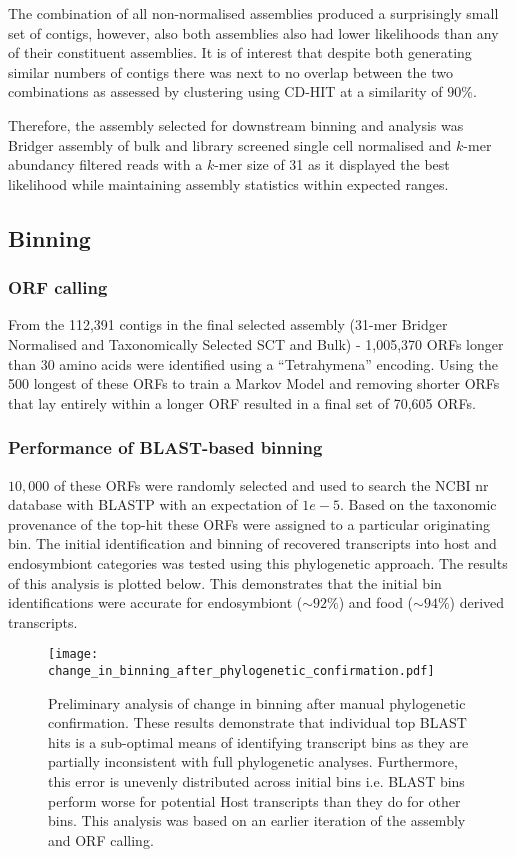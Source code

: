 The combination of all non-normalised assemblies produced a surprisingly small
set of contigs, however, also both assemblies also had lower likelihoods than 
any of their constituent assemblies. It is of interest that despite both
generating similar numbers of contigs there was next to no overlap between 
the two combinations as assessed by clustering using CD-HIT at a similarity of \(90\%\).

Therefore, the assembly selected for downstream binning and analysis was Bridger 
assembly of bulk and library screened single cell normalised and \(k\)-mer
abundancy filtered reads with a \(k\)-mer size of 31 as it displayed the best likelihood
while maintaining assembly statistics within expected ranges. 


\subsection{Binning}

\subsubsection{ORF calling}

From the 112,391 contigs in the final selected assembly (31-mer Bridger
Normalised and Taxonomically Selected SCT and Bulk) - 1,005,370 ORFs
longer than 30 amino acids were identified using a ``Tetrahymena'' encoding.
Using the 500 longest of these ORFs to train a Markov Model and removing
shorter ORFs that lay entirely within a longer ORF resulted in a final set
of 70,605 ORFs.

\subsubsection{Performance of BLAST-based binning}
\(10,000\) of these ORFs were randomly selected and used to search the NCBI
nr database with BLASTP with an expectation of \(1e-5\).  Based on the taxonomic
provenance of the top-hit these ORFs were assigned to a particular originating
bin.  
The initial identification and binning of recovered transcripts into host and endosymbiont categories was 
tested using this phylogenetic approach. The results of this analysis is plotted 
below. This demonstrates that the initial bin identifications were accurate for
endosymbiont (\(\sim92\%\)) and food (\(\sim94\%\)) derived transcripts. 

\begin{figure}[h!]
    \texttt{[image: change\_in\_binning\_after\_phylogenetic\_confirmation.pdf]}
    \caption[Preliminary transcript binning analysis]{Preliminary analysis of change in binning after manual phylogenetic confirmation.  These results demonstrate that individual top BLAST hits is a sub-optimal means of 
    identifying transcript bins as they are partially inconsistent with full phylogenetic analyses. Furthermore,
    this error is unevenly distributed across initial bins i.e. BLAST bins perform worse for potential Host transcripts
    than they do for other bins. 
    	This analysis was based on an earlier iteration of the assembly and ORF calling. }
\end{figure}

